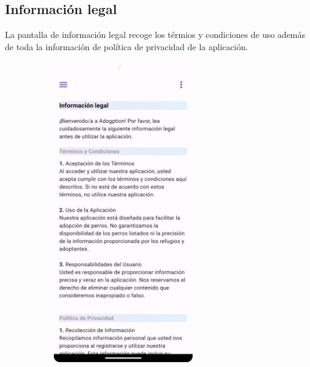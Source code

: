 \documentclass[a4paper, 12pt]{article}
\begin{document}
\newpage
\subsection*{Información legal}

La pantalla de información legal recoge los térmios y condiciones de uso además de toda la información de política de privacidad de la aplicación.

\begin{figure}[H]
   	\begin{subfigure}{0.48\textwidth}
		\begin{center}
			{\includegraphics[width=6cm]{app/LegalPage.png}\par}
		\end{center}  
	\end{subfigure}\hfill
   	\begin{subfigure}{0.48\textwidth}
		\begin{center}

\end{center}
\end{subfigure}
\end{figure}
\end{document}
